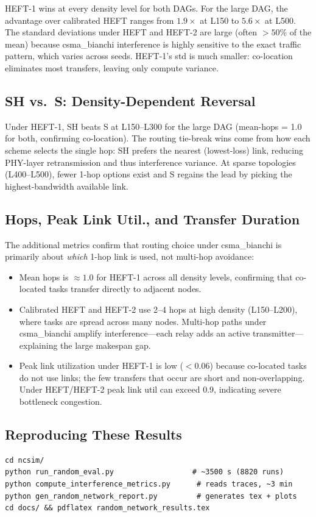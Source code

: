 \documentclass[11pt]{article}
\begin{document}
HEFT-1 wins at every density level for both DAGs. For the large DAG, the advantage over calibrated HEFT ranges from $1.9\times$ at L150 to $5.6\times$ at L500. The standard deviations under HEFT and HEFT-2 are large (often $>50$\% of the mean) because csma\_bianchi interference is highly sensitive to the exact traffic pattern, which varies across seeds. HEFT-1's std is much smaller: co-location eliminates most transfers, leaving only compute variance.

\subsection{SH vs.\ S: Density-Dependent Reversal}

Under HEFT-1, SH beats S at L150--L300 for the large DAG (mean-hops = 1.0 for both, confirming co-location). The routing tie-break wins come from how each scheme selects the single hop: SH prefers the nearest (lowest-loss) link, reducing PHY-layer retransmission and thus interference variance. At sparse topologies (L400--L500), fewer 1-hop options exist and S regains the lead by picking the highest-bandwidth available link.

\subsection{Hops, Peak Link Util., and Transfer Duration}

The additional metrics confirm that routing choice under csma\_bianchi is primarily about \emph{which} 1-hop link is used, not multi-hop avoidance:
\begin{itemize}
  \item Mean hops is $\approx 1.0$ for HEFT-1 across all density levels,    confirming that co-located tasks transfer directly to adjacent nodes.
  \item Calibrated HEFT and HEFT-2 use 2--4 hops at high density (L150--L200),    where tasks are spread across many nodes. Multi-hop paths under csma\_bianchi    amplify interference---each relay adds an active transmitter---explaining    the large makespan gap.
  \item Peak link utilization under HEFT-1 is low ($<0.06$) because    co-located tasks do not use links; the few transfers that occur are    short and non-overlapping. Under HEFT/HEFT-2 peak link util can    exceed 0.9, indicating severe bottleneck congestion.
\end{itemize}

\subsection{Reproducing These Results}
\begin{verbatim}
cd ncsim/
python run_random_eval.py                  # ~3500 s (8820 runs)
python compute_interference_metrics.py      # reads traces, ~3 min
python gen_random_network_report.py         # generates tex + plots
cd docs/ && pdflatex random_network_results.tex
\end{verbatim}
\end{document}
